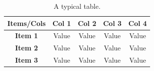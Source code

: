\documentclass{lxaiproposal}
\begin{document}
\begin{table}[h!]
\centering
\caption{A typical table.}
\label{tab:my-table}
\begin{tabular}{@{}ccccc@{}}
\toprule
\textbf{Items/Cols} & \textbf{Col 1} & \textbf{Col 2} & \textbf{Col 3} & \textbf{Col 4} \\ \midrule
\textbf{Item 1}     & Value          & Value          & Value          & Value          \\
\textbf{Item 2}     & Value          & Value          & Value          & Value          \\
\textbf{Item 3}     & Value          & Value          & Value          & Value          \\ \bottomrule
\end{tabular}
\end{table}





\end{document}
